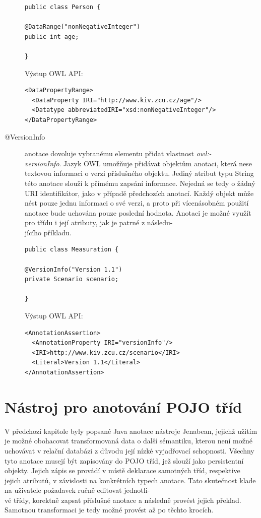 \documentclass{projekt}
\begin{document}
\begin{description}
\begin{verbatim}
public class Person {

@DataRange("nonNegativeInteger")
public int age;

}
\end{verbatim}
Výstup OWL API:
\begin{verbatim}
<DataPropertyRange>
  <DataProperty IRI="http://www.kiv.zcu.cz/age"/>
  <Datatype abbreviatedIRI="xsd:nonNegativeInteger"/>
</DataPropertyRange>

\end{verbatim}

\item[@VersionInfo] anotace dovoluje vybranému elementu přidat vlastnost {\it owl:-\\versionInfo}.
Jazyk OWL umožňuje přidávat objektům anotaci, která nese textovou informaci o verzi příslušného objektu. Jediný atribut typu String této anotace slouží k přímému zapsání informace. Nejedná se tedy o žádný URI identifikátor, jako v případě předchozích anotací. Každý objekt může nést pouze jednu informaci o své verzi, a proto při vícenásobném použití anotace bude uchována pouze poslední hodnota. Anotaci je možné využít pro třídu i její atributy, jak je patrné z následu-\\jícího příkladu.


\begin{verbatim}
public class Measuration {

@VersionInfo("Version 1.1")
private Scenario scenario;

}

\end{verbatim}
Výstup OWL API:
\begin{verbatim}
<AnnotationAssertion>
  <AnnotationProperty IRI="versionInfo"/>
  <IRI>http://www.kiv.zcu.cz/scenario</IRI>
  <Literal>Version 1.1</Literal>
</AnnotationAssertion>
\end{verbatim}




\end{description}


\chapter{Nástroj pro anotování POJO tříd}
\hspace{0.65cm}V předchozí kapitole byly popsané Java anotace nástroje Jenabean, jejichž užitím je možné obohacovat transformovaná data o další sémantiku, kterou není možné uchovávat v relační databázi z důvodu její nízké vyjadřovací schopnosti. Všechny tyto anotace musejí být zapisovány do POJO tříd, jež slouží jako persistentní objekty. Jejich zápis se provádí v místě deklarace samotných tříd, respektive jejich atributů, v závislosti na konkrétních typech anotace.
Tato skutečnost klade na uživatele požadavek ručně editovat jednotli-\\vé třídy, korektně zapsat příslušné anotace a následně  provést jejich překlad. Samotnou transformaci je tedy možné provést až po těchto krocích.
\end{document}
